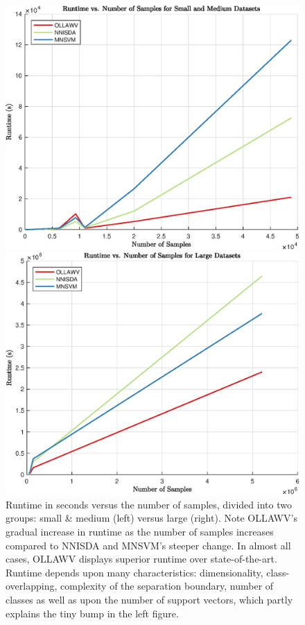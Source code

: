 \documentclass[reqno]{vcuthesis}
\numberwithin{equation}{chapter}
\begin{document}
\begin{figure}[t!]
\centering
\begin{minipage}{0.49\textwidth}
\includegraphics[width=\textwidth]{figures/CPU_vs_NumData_SM.eps}
\end{minipage}
\begin{minipage}{0.49\textwidth}
\includegraphics[width=\textwidth]{figures/CPU_vs_NumData_L.eps}
\end{minipage}
\caption{Runtime in seconds versus the number of samples, divided into two groups: small \& medium (left) versus large (right). Note OLLAWV's gradual increase in runtime as the number of samples increases compared to NNISDA and MNSVM's steeper change. In almost all cases, OLLAWV displays superior runtime over state-of-the-art. Runtime depends upon many characteristics: dimensionality, class-overlapping, complexity of the separation boundary, number of classes as well as upon the number of support vectors, which partly explains the tiny bump in the left figure. }
\label{fig:cpuvssamples}
\end{figure}
\end{document}
